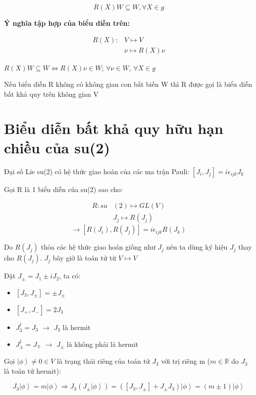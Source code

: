 \documentclass{report}
\begin{document}
\[ R(X)W \subseteq W, \forall X \in g \]

\textbf{Ý nghĩa tập hợp của biểu diễn trên:}

	\begin{align*}
		R(X): & V \longmapsto V \\
		& \nu \longmapsto R(X)\nu
	\end{align*}
	
\(  R(X)W \subseteq W \Leftrightarrow R(X)\nu \in W\);  \(\forall \nu \in W\), \(\forall X \in g\)

Nếu biểu diễn R không có không gian con bất biến W thì R được gọi là biểu diễn bất khả quy trên không gian V

\section{Biểu diễn bất khả quy hữu hạn chiều của su(2)}

Đại số Lie su(2) có hệ thức giao hoán của các ma trận Pauli: \( [J_{i}, J_{j}] = i\epsilon_{ijk}J_{k} \)

Gọi R là 1 biểu diễn của su(2) sao cho:

	\begin{align*}
		R: su &(2) \longmapsto GL(V) \\
		& J_{j} \longmapsto R(J_{j})
	\end{align*}
\[ \rightarrow [R(J_{i}),R(J_{j})] = i\epsilon_{ijk}R(J_{k}) \]

Do \(R(J_{j})\) thỏa các hệ thức giao hoán giống như \(J_{j}\) nên ta dùng ký hiệu \(J_{j}\) thay cho \(R(J_{j})\). \(J_{j}\) bây giờ là toán tử từ \( V \longmapsto V \)

Đặt \(J_{\pm} = J_{1} \pm i J_{2} \), ta có:

	\begin{itemize}
		\item \( [J_{3},J_{\pm}] = \pm J_{\pm} \)
		\item \( [J_{+},J_{-}] = 2 J_{3} \)
		\item \( J_{3}^{\dagger} = J_{3} \) \(\rightarrow\) \(J_{3}\) là hermit
		\item \( J_{\pm}^{\dagger} = J_{\mp} \) \(\rightarrow\) \(J_{\pm}\) là không phải là hermit 
	\end{itemize}
	
Gọi \( \left| {\phi} \right\rangle \neq 0 \in V \) là trạng thái riêng của toán tử \(J_{3}\) với trị riêng m (\( m \in \mathbb{R} \) do \(J_{3}\) là 
toán tử hermit):

\[ J_{3} \left| {\phi} \right\rangle = m \left| {\phi} \right\rangle \Rightarrow J_{3} \left( J_{\pm} \left| {\phi} \right\rangle \right) = \left( \left[ J_{3}, J_{\pm} \right] + J_{\pm} J_{3} \right) \left| {\phi} \right\rangle = \left( m \pm 1 \right) \left| {\phi} \right\rangle \]
\end{document}
